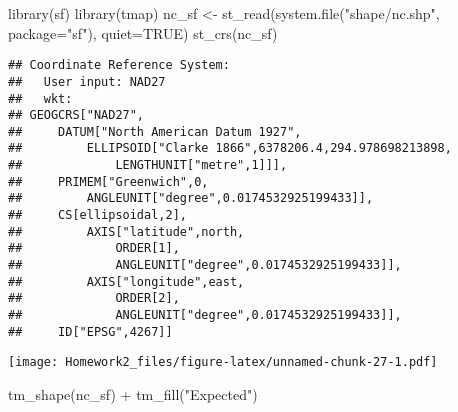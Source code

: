 \documentclass[
]{article}
\newenvironment{Shaded}{\begin{snugshade}}{\end{snugshade}}
\newcommand{\AttributeTok}[1]{\textcolor[rgb]{0.77,0.63,0.00}{#1}}
\newcommand{\ConstantTok}[1]{\textcolor[rgb]{0.00,0.00,0.00}{#1}}
\newcommand{\FunctionTok}[1]{\textcolor[rgb]{0.00,0.00,0.00}{#1}}
\newcommand{\NormalTok}[1]{#1}
\newcommand{\OtherTok}[1]{\textcolor[rgb]{0.56,0.35,0.01}{#1}}
\newcommand{\SpecialCharTok}[1]{\textcolor[rgb]{0.00,0.00,0.00}{#1}}
\newcommand{\StringTok}[1]{\textcolor[rgb]{0.31,0.60,0.02}{#1}}
\begin{document}
\begin{Shaded}
\begin{Highlighting}[]
\FunctionTok{library}\NormalTok{(sf)}
\FunctionTok{library}\NormalTok{(tmap)}
\NormalTok{nc\_sf }\OtherTok{\textless{}{-}} \FunctionTok{st\_read}\NormalTok{(}\FunctionTok{system.file}\NormalTok{(}\StringTok{"shape/nc.shp"}\NormalTok{, }\AttributeTok{package=}\StringTok{"sf"}\NormalTok{),}
\AttributeTok{quiet=}\ConstantTok{TRUE}\NormalTok{)}
\FunctionTok{st\_crs}\NormalTok{(nc\_sf)}
\end{Highlighting}
\end{Shaded}

\begin{verbatim}
## Coordinate Reference System:
##   User input: NAD27 
##   wkt:
## GEOGCRS["NAD27",
##     DATUM["North American Datum 1927",
##         ELLIPSOID["Clarke 1866",6378206.4,294.978698213898,
##             LENGTHUNIT["metre",1]]],
##     PRIMEM["Greenwich",0,
##         ANGLEUNIT["degree",0.0174532925199433]],
##     CS[ellipsoidal,2],
##         AXIS["latitude",north,
##             ORDER[1],
##             ANGLEUNIT["degree",0.0174532925199433]],
##         AXIS["longitude",east,
##             ORDER[2],
##             ANGLEUNIT["degree",0.0174532925199433]],
##     ID["EPSG",4267]]
\end{verbatim}

\begin{Shaded}
\end{Shaded}

\texttt{[image: Homework2\_files/figure-latex/unnamed-chunk-27-1.pdf]}

\begin{Shaded}
\begin{Highlighting}[]
\FunctionTok{tm\_shape}\NormalTok{(nc\_sf) }\SpecialCharTok{+} \FunctionTok{tm\_fill}\NormalTok{(}\StringTok{"Expected"}\NormalTok{)}
\end{Highlighting}
\end{Shaded}
\end{document}

